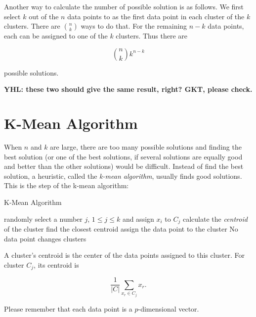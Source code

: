 Another way to calculate the number of possible solution is as follows.
We first select $k$ out of the $n$ data points to as the first data
point in each cluster of the $k$ clusters. There are $\binom{n}{k}$
ways to do that.  For the remaining $n-k$ data points, each can be
assigned to one of the $k$ clusters. Thus there are

\begin{equation}
  \binom{n}{k} k^{n-k}
\end{equation}

possible solutions.

{\bf YHL: these two should give the same result, right? GKT, please check.}




\section{K-Mean Algorithm}

When $n$ and $k$ are large, there are too many possible solutions and
finding the best solution (or one of the best solutions, if several
solutions are equally good and better than the other solutions) would
be difficult. Instead of find the best solution, a heuristic, called
the {\it k-mean algorithm}, usually finds good solutions.  This is the
step of the k-mean algorithm:


\begin{algorithm}
    \caption[]{K-Mean Algorithm}
    \begin{algorithmic}[1]
      randomly select a number $j$, $1 \le j \le k$ and assign
      $x_i$ to $C_j$
      \EndFor
      \Repeat 
      \State
      calculate the {\it centroid} of the cluster
      \EndFor
      \State find the closest centroid
      \State assign the data point to  the cluster
      \EndFor
      \Until No data point changes clusters
    \end{algorithmic}
    \label{algorithm:kmean}
\end{algorithm}

A cluster's centroid is  the center of the data points assigned to this cluster.
For cluster $C_j$, its centroid is 

\begin{equation}
\frac{1}{|C|} \underset{x_r \in C_j}{\sum} x_r.
\end{equation}  

Please remember that each data point is a $p$-dimensional vector.

